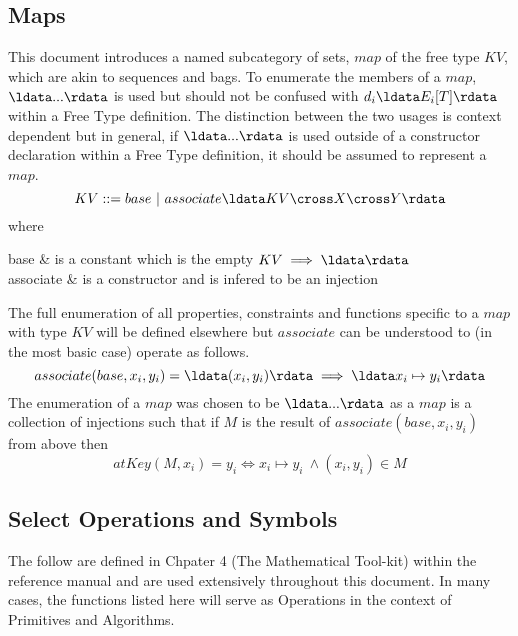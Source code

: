\documentclass[../main.tex]{subfiles}
\begin{document}
\subsection{Maps}
This document introduces a named subcategory of sets, $map$ of the free type $KV$,
which are akin to sequences and bags. To enumerate the members of a $map$, $\ldata ... \rdata$ is used
but should not be confused with $d_{i}\ldata E_{i}[T]\rdata$ within a Free Type definition. The
distinction between the two usages is context dependent but in general, if $\ldata ... \rdata$
is used outside of a constructor declaration within a Free Type definition,
it should be assumed to represent a $map$.
$$KV ::= base ~| ~associate\ldata KV \cross X \cross Y \rdata$$
where
\begin{argue}
  base & is a constant which is the empty $KV \implies \ldata \rdata$ \\
  associate & is a constructor and is infered to be an injection
\end{argue}
The full enumeration of all properties, constraints and functions
specific to a $map$ with type $KV$ will be defined elsewhere but
$associate$ can be understood to (in the most basic case) operate as follows.
$$associate(base, x_{i}, y_{i}) = \ldata (x_{i}, y_{i}) \rdata \implies \ldata x_{i} \mapsto y_{i} \rdata$$
The enumeration of a $map$ was chosen to be $\ldata ... \rdata$ as a $map$ is a collection of injections
such that if $M$ is the result of $associate(base, x_{i}, y_{i})$ from above then
$$atKey(M, x_{i}) = y_{i} \iff x_{i} \mapsto y_{i} ~\land (x_{i}, y_{i}) \in M$$

\subsection{Select Operations and Symbols}
The follow are defined in Chpater 4 (The Mathematical Tool-kit) within the reference manual
and are used extensively throughout this document. In many cases, the functions listed here
will serve as Operations in the context of Primitives and Algorithms.
\end{document}
